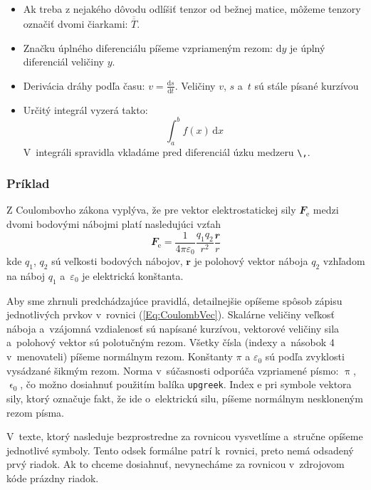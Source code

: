 \begin{itemize}
    \item Ak treba z nejakého dôvodu odlíšiť tenzor
    od bežnej matice, môžeme tenzory označiť dvomi čiarkami:
    $\overline{\overline T}$.

    \item Značku úplného diferenciálu píšeme vzpriameným rezom:
    $\mathrm dy$ je úplný diferenciál veličiny $y$.

    \item Derivácia dráhy podľa času:
    $v = \frac{\mathrm ds}{\mathrm dt}$.
    Veličiny $v$, $s$ a~$t$ sú stále písané kurzívou

    \item Určitý integrál vyzerá takto:
    $$
    \int_a^b f(x)\,\mathrm dx
    $$
    V~integráli spravidla vkladáme pred diferenciál
    úzku medzeru \verb|\,|.
\end{itemize}

\subsubsection*{\normalsize Príklad}
Z Coulombovho zákona vyplýva,
že pre vektor elektrostatickej sily $\mathbfit F_\mathrm e$
medzi dvomi bodovými nábojmi platí nasledujúci vzťah
\begin{equation}\label{Eq:CoulombVec}
  \mathbfit F_\mathrm e = \frac1{4\pi\varepsilon_0}
  \frac{q_1q_2}{r^2}\frac{\mathbfit r}r
\end{equation}
kde $q_1$, $q_2$ sú veľkosti bodových nábojov,
$\mathbf r$ je polohový vektor náboja $q_2$
vzhľadom na náboj $q_1$
a~$\varepsilon_0$ je elektrická konštanta.

Aby sme zhrnuli predchádzajúce pravidlá, detailnejšie opíšeme spôsob zápisu jednotlivých prvkov
v~rovnici (\ref{Eq:CoulombVec}).
Skalárne veličiny veľkosť náboja a~vzájomná vzdialenosť sú
napísané kurzívou,
vektorové veličiny sila a~polohový vektor sú polotučným rezom.
Všetky čísla (indexy a~násobok 4 v~menovateli)
píšeme normálnym rezom.
Konštanty $\pi$ a $\varepsilon_0$ sú podľa zvyklosti vysádzané
šikmým rezom.
Norma v~súčasnosti odporúča vzpriamené písmo:
$\uppi$, $\upvarepsilon_0$, čo možno dosiahnuť použitím balíka
\verb|upgreek|.
Index $\mathrm e$ pri symbole vektora sily,
ktorý označuje fakt, že ide o~elektrickú silu,
píšeme normálnym neskloneným rezom písma.

V~texte, ktorý nasleduje bezprostredne za rovnicou vysvetlíme
a~stručne opíšeme jednotlivé symboly.
Tento odsek formálne patrí k~rovnici,
preto nemá odsadený prvý riadok.
Ak to chceme dosiahnuť,
nevynecháme za rovnicou v~zdrojovom kóde
prázdny riadok.

